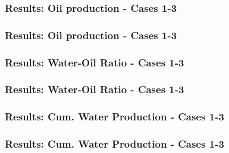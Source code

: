 \begin{frame}[label=oilprod13]
    \frametitle{Results: Oil production - Cases 1-3}
    \centerline{}
\end{frame}

\begin{frame}
    \frametitle{Results: Oil production - Cases 1-3}
    \centerline{}
\end{frame}

\begin{frame}[label=wor13]
    \frametitle{Results: Water-Oil Ratio - Cases 1-3}
    \centerline{}
\end{frame}

\begin{frame}
    \frametitle{Results: Water-Oil Ratio - Cases 1-3}
    \centerline{}
\end{frame}

\begin{frame}
    \frametitle{Results: Cum. Water Production - Cases 1-3}
    \centerline{}
\end{frame}

\begin{frame}
    \frametitle{Results: Cum. Water Production - Cases 1-3}
    \centerline{}
\end{frame}

